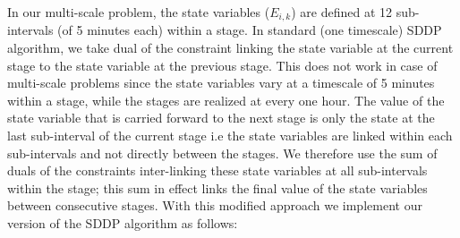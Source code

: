 \documentclass[11pt,twoside]{article}
\begin{document}
In our multi-scale problem, the state variables ($E_{i,k}$) are defined at 12 sub-intervals (of 5 minutes each) within a stage.  In standard (one timescale) SDDP algorithm, we take dual of the constraint linking the state variable at the current stage to the state variable at the previous stage. This does not work in case of multi-scale problems since the state variables vary at a timescale of 5 minutes within a stage, while the stages are realized at every one hour. The value of the state variable that is carried forward to the next stage is only the state at the last sub-interval of the current stage i.e the state variables are linked within each sub-intervals and not directly between the stages. We therefore use the sum of duals of the constraints inter-linking these state variables at all sub-intervals within the stage; this sum in effect links the final value of the state variables between consecutive stages. With this modified approach we implement our version of the SDDP algorithm as follows:    
\end{document}
